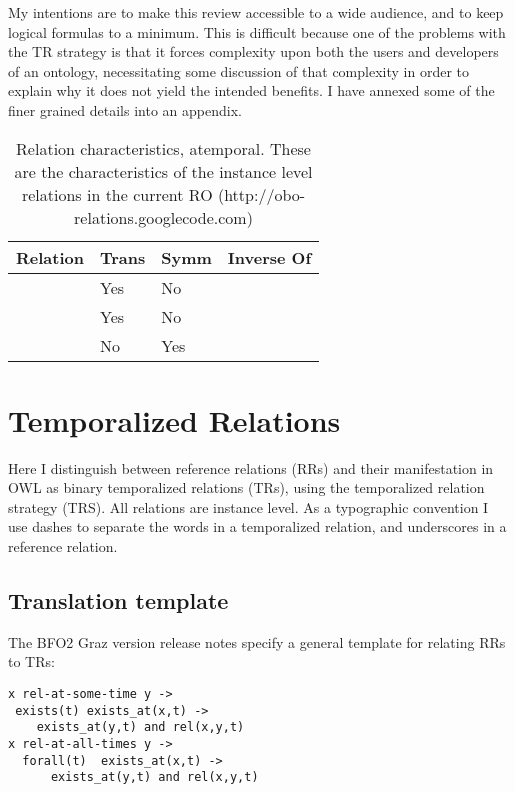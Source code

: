 \documentclass{bioinfo}
\def\partOf{\pr{part\_of}}
\def\hasPart{\pr{has\_part}}
\def\adjacentTo{\pr{adjacent\_to}}
\begin{document}
My intentions are to make this review accessible to a wide audience,
and to keep logical formulas to a minimum. This is difficult because
one of the problems with the TR strategy is that it forces complexity
upon both the users and developers of an ontology, necessitating some
discussion of that complexity in order to explain why it does not
yield the intended benefits. I have annexed some of the finer grained
details into an appendix.

\begin{table}
\begin{tabular}{ | p{2.5cm} | p{1cm} | p{1cm} | p{2.5cm} | }
\hline
\textbf{Relation} & \textbf{Trans} & \textbf{Symm} & \textbf{Inverse Of}  \\
\hline
\partOf\  & Yes & No & \hasPart  \\
\hline
\hasPart\ & Yes & No & \partOf \\
\hline
\adjacentTo\ & No & Yes &  \\
\hline
\end{tabular}
\caption{Relation characteristics, atemporal. These are the characteristics of the instance level relations in the current RO (http://obo-relations.googlecode.com)}
\label{tab:characteristics-atemporal}
\end{table}


\section{Temporalized Relations}

Here I distinguish between reference relations (RRs) and their
manifestation in OWL as binary temporalized relations (TRs), using the
temporalized relation strategy (TRS). All relations are instance
level. As a typographic convention I use dashes to separate the words
in a temporalized relation, and underscores in a reference relation.

\subsection{Translation template}

The BFO2 Graz version release notes\cite{Graz} specify a general
template for relating RRs to TRs:

\begin{verbatim}
x rel-at-some-time y ->
 exists(t) exists_at(x,t) -> 
    exists_at(y,t) and rel(x,y,t)
x rel-at-all-times y ->
  forall(t)  exists_at(x,t) -> 
      exists_at(y,t) and rel(x,y,t)
\end{verbatim}
\end{document}
